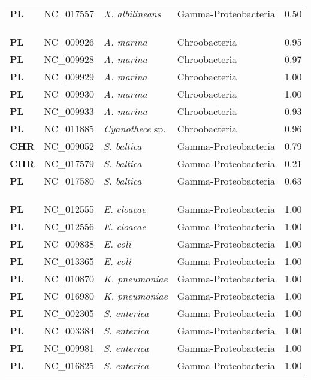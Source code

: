 \begin{adjustwidth}{-3cm}{2cm}
{\begin{supertabular}{>{\bfseries}l|p{0.1\textwidth}p{0.14\textwidth}l|l}
PL & NC\_017557 & \textit{X. albilineans} & Gamma-Proteobacteria & 0.50\\
\\
\\
\hline\\
PL & NC\_009926 & \textit{A. marina} & Chroobacteria & 0.95\\
   PL & NC\_009928 & \textit{A. marina} & Chroobacteria & 0.97\\
PL & NC\_009929 & \textit{A. marina} & Chroobacteria & 1.00\\
PL & NC\_009930 & \textit{A. marina} & Chroobacteria & 1.00\\
PL & NC\_009933 & \textit{A. marina} & Chroobacteria & 0.93\\
PL & NC\_011885 & \textit{Cyanothece} sp. & Chroobacteria & 0.96\\
CHR & NC\_009052 & \textit{S. baltica} & Gamma-Proteobacteria & 0.79\\
CHR & NC\_017579 & \textit{S. baltica} & Gamma-Proteobacteria & 0.21\\
PL & NC\_017580 & \textit{S. baltica} & Gamma-Proteobacteria & 0.63\\
\\
\\
\hline\\
PL & NC\_012555 & \textit{E. cloacae} & Gamma-Proteobacteria & 1.00\\
PL & NC\_012556 & \textit{E. cloacae} & Gamma-Proteobacteria & 1.00\\
PL & NC\_009838 & \textit{E. coli} & Gamma-Proteobacteria & 1.00\\
PL & NC\_013365 & \textit{E. coli} & Gamma-Proteobacteria & 1.00\\
PL & NC\_010870 & \textit{K. pneumoniae} & Gamma-Proteobacteria & 1.00\\
PL & NC\_016980 & \textit{K. pneumoniae} & Gamma-Proteobacteria & 1.00\\
PL & NC\_002305 & \textit{S. enterica} & Gamma-Proteobacteria & 1.00\\
PL & NC\_003384 & \textit{S. enterica} & Gamma-Proteobacteria & 1.00\\
PL & NC\_009981 & \textit{S. enterica} & Gamma-Proteobacteria & 1.00\\
PL & NC\_016825 & \textit{S. enterica} & Gamma-Proteobacteria & 1.00\\

\end{supertabular}}
\end{adjustwidth}
